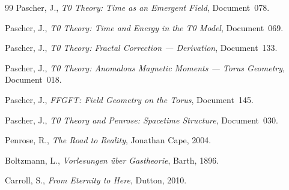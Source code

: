 \begin{thebibliography}{99}
	Pascher, J., \emph{T0 Theory: Time as an Emergent Field}, Document~078.
	
	Pascher, J., \emph{T0 Theory: Time and Energy in the T0 Model}, Document~069.
	
	Pascher, J., \emph{T0 Theory: Fractal Correction --- Derivation}, Document~133.
	
	Pascher, J., \emph{T0 Theory: Anomalous Magnetic Moments --- Torus Geometry}, Document~018.
	
	Pascher, J., \emph{FFGFT: Field Geometry on the Torus}, Document~145.
	
	Pascher, J., \emph{T0 Theory and Penrose: Spacetime Structure}, Document~030.
	
	Penrose, R., \emph{The Road to Reality}, Jonathan Cape, 2004.
	
	Boltzmann, L., \emph{Vorlesungen \"uber Gastheorie}, Barth, 1896.
	
	Carroll, S., \emph{From Eternity to Here}, Dutton, 2010.
\end{thebibliography}
